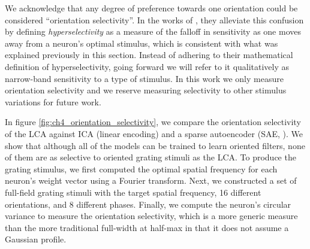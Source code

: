 We acknowledge that any degree of preference towards one orientation could be considered ``orientation selectivity''.
In the works of \parencite{golden2016conjectures,vilankar2017selectivity}, they alleviate this confusion by defining \textit{hyperselectivity} as a measure of the falloff in sensitivity as one moves away from a neuron's optimal stimulus, which is consistent with what was explained previously in this section.
Instead of adhering to their mathematical definition of hyperselectivity, going forward we will refer to it qualitatively as narrow-band sensitivity to a type of stimulus.
In this work we only measure orientation selectivity and we reserve measuring selectivity to other stimulus variations for future work.

In figure \ref{fig:ch4_orientation_selectivity}, we compare the orientation selectivity of the LCA against ICA (linear encoding) and a sparse autoencoder (SAE, \cite{ng2011sparse}).
We show that although all of the models can be trained to learn oriented filters, none of them are as selective to oriented grating stimuli as the LCA.
To produce the grating stimulus, we first computed the optimal spatial frequency for each neuron's weight vector using a Fourier transform.
Next, we constructed a set of full-field grating stimuli with the target spatial frequency, 16 different orientations, and 8 different phases.
Finally, we compute the neuron's circular variance to measure the orientation selectivity, which is a more generic measure than the more traditional full-width at half-max \parencite{ringach2002orientation} in that it does not assume a Gaussian profile.

